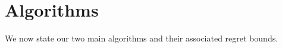 \documentclass[paper_icml.tex]{subfiles}
\begin{document}
\section{Algorithms} 
\label{sec:algorithms}
We now state our two main algorithms and their associated 
regret bounds.
\end{document}
